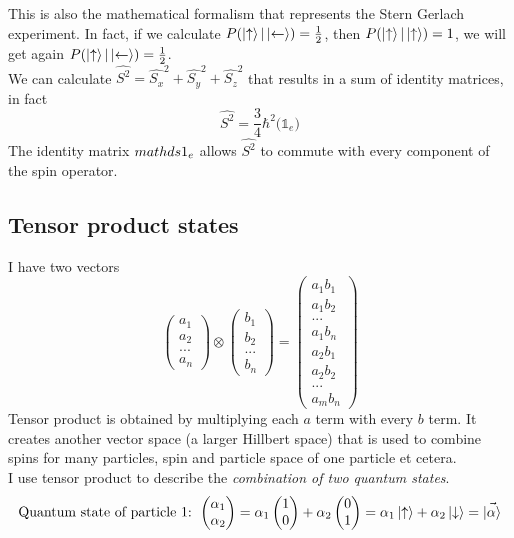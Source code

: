 This is also the mathematical formalism that represents the Stern Gerlach experiment. In fact, if we calculate $P(\ket{\uparrow}|\ket{\leftarrow}) = \frac{1}{2}$, then $P(\ket{\uparrow}|\ket{\uparrow}) = 1$, we will get again $P(\ket{\uparrow}|\ket{\leftarrow}) = \frac{1}{2}$.  \\
We can calculate $\hat{S^2} = \hat{S_x}^2+\hat{S_y}^2+\hat{S_z}^2$ that results in a sum of identity matrices, in fact
\[\hat{S^2}=\frac{3}{4}\hbar^2\big(\mathds{1}_e\big)\]
The identity matrix $\\mathds{1}_e$ allows $\hat{S^2}$ to commute with every component of the spin operator.

\subsection{Tensor product states}
I have two vectors
\[
\begin{pmatrix}a_1\\a_2\\...\\a_n\end{pmatrix}\otimes\begin{pmatrix}b_1\\b_2\\...\\b_n\end{pmatrix}=\begin{pmatrix}a_1b_1\\a_1b_2\\...\\a_1b_n\\a_2b_1\\a_2b_2\\...\\a_mb_n\end{pmatrix}
\]
Tensor product is obtained by multiplying each $a$ term with every $b$ term. It creates another vector space (a larger Hillbert space) that is used to combine spins for many particles, spin and particle space of one particle et cetera.\\
I use tensor product to describe the \emph{combination of two quantum states}.
\[\text{Quantum state of particle 1: } \begin{pmatrix}\alpha_1\\\alpha_2\end{pmatrix}=\alpha_1\begin{pmatrix}1\\0\end{pmatrix}+\alpha_2\begin{pmatrix}0\\1\end{pmatrix}=\alpha_1\ket{\uparrow}+\alpha_2\ket{\downarrow}=\vec{\ket\alpha}\]

